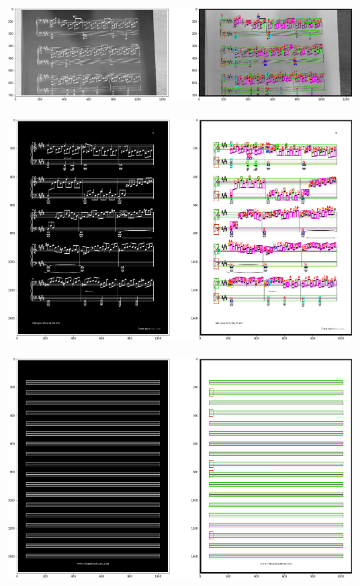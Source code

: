 \documentclass[12pt]{article}
\begin{document}
\begin{enumerate}
\begin{figure}[h!]
				\begin{subfigure}[b]{0.48\linewidth}
					\includegraphics[width=\linewidth]{Eazy/Zdj15.png}
				\end{subfigure}
				\begin{subfigure}[b]{0.48\linewidth}
					\includegraphics[width=\linewidth]{Eazy/Zdj16.png}
				\end{subfigure}
				\begin{subfigure}[b]{0.48\linewidth}
					\includegraphics[width=\linewidth]{Eazy/Zdj17.png}
				\end{subfigure}
				\begin{subfigure}[b]{0.48\linewidth}

\end{subfigure}
\end{figure}
\end{enumerate}
\end{document}
